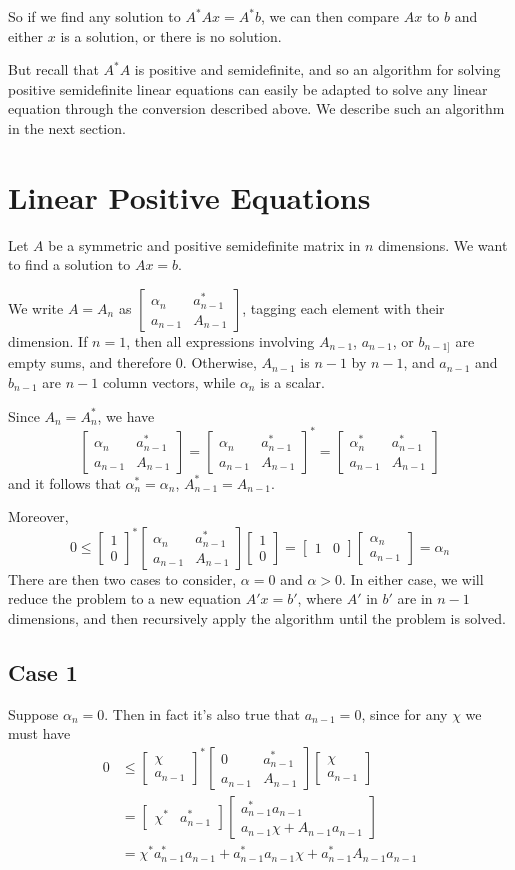 \documentclass[12pt]{article}
\newcommand{\bmat}[1]{\begin{bmatrix}#1\end{bmatrix}}
\begin{document}
So if we find any solution to $A^*Ax = A^*b$, we can then compare $Ax$ to $b$
and either $x$ is a solution, or there is no solution.

But recall that $A^*A$ is positive and semidefinite, and so an algorithm for
solving positive semidefinite linear equations can easily be adapted to solve
any linear equation through the conversion described above. We describe such an
algorithm in the next section.

\section{Linear Positive Equations}

Let $A$ be a symmetric and positive semidefinite matrix in $n$ dimensions. We want to find a solution to
$Ax = b$.

We write $A = A_n$ as $\bmat{\alpha_n & a^*_{n - 1} \\ a_{n - 1} & A_{n
    - 1}}$, tagging each element with their dimension.
If $n = 1$, then all expressions involving $A_{n-1}$, $a_{n - 1}$, or $b_{n - 1]}$ are
empty sums, and therefore 0. Otherwise, $A_{n - 1}$ is $n-1$ by $n-1$, and $a_{n
- 1}$ and $b_{n - 1}$ are $n-1$ column vectors, while $\alpha_n$ is a scalar.

Since $A_n=A^*_n$, we have
$$ \bmat{\alpha_n & a^*_{n-1} \\ a_{n - 1} & A_{n - 1}} = 
   \bmat{\alpha_n & a_{n-1}^* \\ a_{n-1} & A_{n-1}}^* = 
   \bmat{\alpha_n^* & a_{n-1}^* \\ a_{n-1} & A_{n-1}} $$
and it follows that $\alpha_n^*=\alpha_n$, $A_{n-1}^{*} = A_{n-1}$.

Moreover, 
$$
0 \leq \bmat{1\\0}^*\bmat{\alpha_n & a_{n-1}^* \\ a_{n-1} & A_{n-1}}\bmat{1\\0}
= \bmat{1&0}\bmat{\alpha_n \\ a_{n-1}}
= \alpha_n
$$
There are then two cases to consider, $\alpha = 0$ and $\alpha > 0$. In either
case, we will reduce the problem to a new equation $A'x = b'$, where $A'$ in
$b'$ are in $n - 1$ dimensions, and then recursively apply the algorithm until
the problem is solved.

\subsection{Case 1}
Suppose $\alpha_n=0$. Then in fact it's also true that $a_{n-1}=0$, since for
any $\chi$ we must have
\begin{align*}
  0 &\leq \bmat{\chi\\a_{n-1}}^*\bmat{0 & a_{n-1}^*
  \\ a_{n-1} & A_{n-1}}\bmat{\chi\\a_{n - 1}} \\&= \bmat{\chi^* & a_{n-1}^*} \bmat{a_{n-1}^*a_{n-1}\\a_{n-1}\chi+A_{n-1}a_{n-1}}
\\&= \chi^*a_{n-1}^*a_{n-1} + a_{n-1}^*a_{n-1}\chi + a_{n-1}^*A_{n-1}a_{n-1}
\end{align*}
\end{document}
